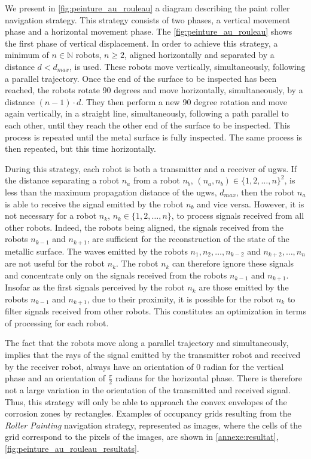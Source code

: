 We present in \ref{fig:peinture_au_rouleau} a diagram describing the paint roller navigation strategy.
This strategy consists of two phases, a vertical movement phase and a horizontal movement phase.
The \ref{fig:peinture_au_rouleau} shows the first phase of vertical displacement.
In order to achieve this strategy, a minimum of $n \in \mathbb{N}$ robots, $n \ge 2$, aligned horizontally and separated by a distance $d < d_{max}$, is used.
These robots move vertically, simultaneously, following a parallel trajectory.
Once the end of the surface to be inspected has been reached, the robots rotate 90 degrees and move horizontally, simultaneously, by a distance $(n - 1) \cdot d$.
They then perform a new 90 degree rotation and move again vertically, in a straight line, simultaneously, following a path parallel to each other, until they reach the other end of the surface to be inspected.
This process is repeated until the metal surface is fully inspected.
The same process is then repeated, but this time horizontally.

During this strategy, each robot is both a transmitter and a receiver of \gls{ugw}s.
If the distance separating a robot $n_a$ from a robot $n_b$, $(n_a, n_b) \in \{1, 2, \dots, n\}^2$, is less than the maximum propagation distance of the \gls{ugw}s, $d_{max}$, then the robot $n_a$ is able to receive the signal emitted by the robot $n_b$ and vice versa.
However, it is not necessary for a robot $n_k$, $n_k \in \{1, 2, \dots, n\}$, to process signals received from all other robots.
Indeed, the robots being aligned, the signals received from the robots $n_{k-1}$ and $n_{k+1}$, are sufficient for the reconstruction of the state of the metallic surface.
The waves emitted by the robots $n_1, n_2, \dots, n_{k-2}$ and $n_{k+2}, \dots, n_n$ are not useful for the robot $n_k$.
The robot $n_k$ can therefore ignore these signals and concentrate only on the signals received from the robots $n_{k-1}$ and $n_{k+1}$.
Insofar as the first signals perceived by the robot $n_k$ are those emitted by the robots $n_{k-1}$ and $n_{k+1}$, due to their proximity, it is possible for the robot $n_k$ to filter signals received from other robots.
This constitutes an optimization in terms of processing for each robot.

The fact that the robots move along a parallel trajectory and simultaneously, implies that the rays of the signal emitted by the transmitter robot and received by the receiver robot, always have an orientation of $0$ radian for the vertical phase and an orientation of $\frac{\pi}{2}$ radians for the horizontal phase.
There is therefore not a large variation in the orientation of the transmitted and received signal.
Thus, this strategy will only be able to approach the convex envelopes of the corrosion zones by rectangles.
Examples of occupancy grids resulting from the \textit{Roller Painting} navigation strategy, represented as images, where the cells of the grid correspond to the pixels of the images, are shown in \ref{annexe:resultat}, \ref{fig:peinture_au_rouleau_resultats}.

